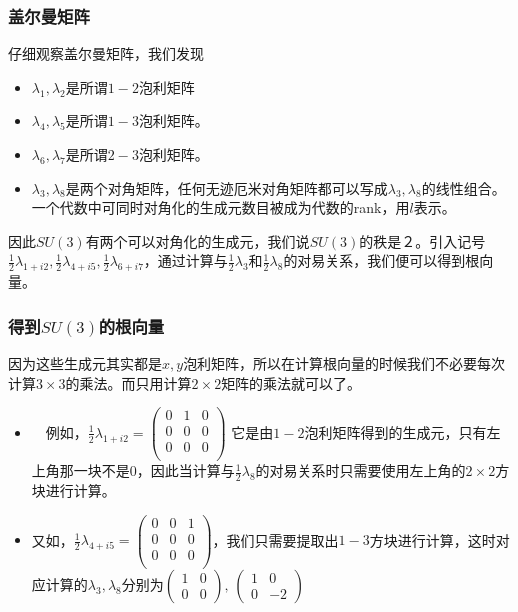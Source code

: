 \documentclass[aspectratio=1610,12pt]{beamer}
\begin{document}
\begin{frame}\frametitle{盖尔曼矩阵}
  仔细观察盖尔曼矩阵，我们发现
  \begin{itemize}
  \item $\lambda_1,\lambda_2$是所谓$1-2$泡利矩阵
  \item $\lambda_4,\lambda_5$是所谓$1-3$泡利矩阵。
  \item $\lambda_6,\lambda_7$是所谓$2-3$泡利矩阵。
  \item $\lambda_3,\lambda_8$是两个对角矩阵，任何无迹厄米对角矩阵都可以写成$\lambda_3,\lambda_8$的线性组合。一个代数中可同时对角化的生成元数目被成为代数的rank，用$l$表示。
  \end{itemize}
  因此$SU(3)$有两个可以对角化的生成元，我们说$SU(3)$的秩是２。引入记号$\frac{1}{2}\lambda_{1+i2},\frac{1}{2}\lambda_{4+i5},\frac12\lambda_{6+i7}$，通过计算与$\frac12\lambda_3$和$\frac12\lambda_8$的对易关系，我们便可以得到根向量。  
\end{frame}
\begin{frame}\frametitle{得到$SU(3)$的根向量}
因为这些生成元其实都是$x,y$泡利矩阵，所以在计算根向量的时候我们不必要每次计算$3\times 3$的乘法。而只用计算$2\times 2$矩阵的乘法就可以了。
\begin{itemize}
  \item　例如，$\frac{1}{2}\lambda_{1+i2} = \begin{pmatrix} 0&1&0 \\ 0&0&0 \\ 0&0&0\\
  \end{pmatrix}$
  它是由$1-2$泡利矩阵得到的生成元，只有左上角那一块不是$0$，因此当计算与$\frac{1}{2}\lambda_8$的对易关系时只需要使用左上角的$2\times2$方块进行计算。
  \item 又如，$\frac{1}{2}\lambda_{4+i5} = \begin{pmatrix} 0&0&1 \\ 0&0&0 \\ 0&0&0\\
  \end{pmatrix}$，我们只需要提取出$1-3$方块进行计算，这时对应计算的$\lambda_3,\lambda_8$分别为$\begin{pmatrix} 1&0\\0&0\end{pmatrix},\,\begin{pmatrix} 1&0\\0&-2\end{pmatrix}$
  \end{itemize}
\end{frame}
\end{document}
